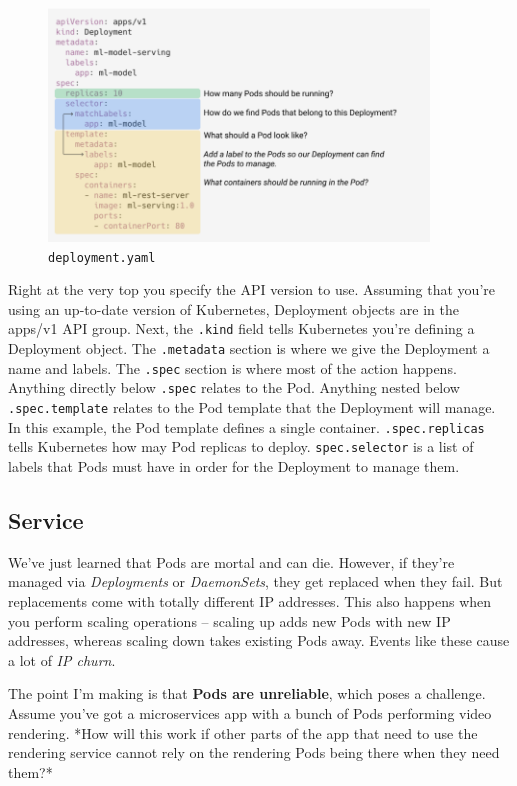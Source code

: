 \documentclass[10pt,a4paper]{report}
\begin{document}
\begin{figure}[h]
	\centering
	\includegraphics[width=0.9\textwidth]{image-deployment-k8s}
	\caption{\texttt{deployment.yaml}}
	\label{k8s-deployment}
\end{figure} 

Right at the very top you specify the API version to use. Assuming that you’re using an up-to-date version of Kubernetes, Deployment objects are in the apps/v1 API group.
Next, the \texttt{.kind} field tells Kubernetes you’re defining a Deployment object. The \texttt{.metadata} section is where we give the Deployment a name and labels.
The \texttt{.spec} section is where most of the action happens. Anything directly below \texttt{.spec} relates to the Pod. Anything nested below \texttt{.spec.template} relates to the Pod template that the Deployment will manage. In this example, the Pod template defines a single container. \texttt{.spec.replicas} tells Kubernetes how may Pod replicas to deploy. \texttt{spec.selector} is a list of labels that Pods must have in order for the Deployment to manage them. 

\subsection{Service}
We’ve just learned that Pods are mortal and can die. However, if they’re managed via \textit{Deployments} or \textit{DaemonSets}, they get replaced when they fail. But replacements come with totally different IP addresses. This also happens when you perform scaling operations – scaling up adds new Pods with new IP addresses, whereas scaling down takes existing Pods away. Events like these cause a lot of \textit{IP churn}.

The point I’m making is that \textbf{Pods are unreliable}, which poses a challenge. Assume you’ve got a microservices app with a bunch of Pods performing video rendering. *How will this work if other parts of the app that need to use the rendering service cannot rely on the rendering Pods being there when they need them?*
\end{document}

